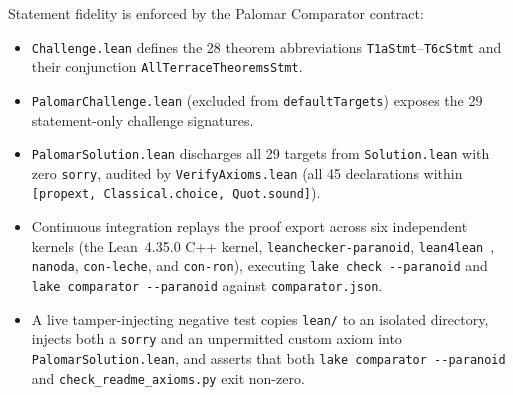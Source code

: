 \documentclass[11pt,reqno]{amsart}
\newcommand{\code}[1]{\textnormal{\texttt{\small\nolinkurl{#1}}}}
\newcommand{\cmd}[1]{\textnormal{\texttt{\small #1}}}
\theoremstyle{plain}
\theoremstyle{definition}
\theoremstyle{remark}
\begin{document}
Statement fidelity is enforced by the Palomar Comparator contract:
\begin{itemize}[leftmargin=2em]
  \item \code{Challenge.lean} defines the 28 theorem abbreviations \cmd{T1aStmt}--\cmd{T6cStmt}
    and their conjunction \code{AllTerraceTheoremsStmt}.
  \item \code{PalomarChallenge.lean} (excluded from \cmd{defaultTargets}) exposes the 29
    statement-only challenge signatures.
  \item \code{PalomarSolution.lean} discharges all 29 targets from \code{Solution.lean} with zero
    \cmd{sorry}, audited by \code{VerifyAxioms.lean} (all 45 declarations within
    \code{[propext, Classical.choice, Quot.sound]}).
  \item Continuous integration replays the proof export across six independent kernels (the
    Lean~4.35.0 C++ kernel, \cmd{leanchecker-paranoid}, \cmd{lean4lean}~\cite{carneiro2024lean4lean},
    \cmd{nanoda}, \cmd{con-leche}, and \cmd{con-ron}), executing \cmd{lake check -{}-paranoid}
    and \cmd{lake comparator -{}-paranoid} against \code{comparator.json}.
  \item A live tamper-injecting negative test copies \code{lean/} to an isolated directory,
    injects both a \cmd{sorry} and an unpermitted custom axiom into \code{PalomarSolution.lean},
    and asserts that both \cmd{lake comparator -{}-paranoid} and \code{check_readme_axioms.py}
    exit non-zero.
\end{itemize}
\end{document}
